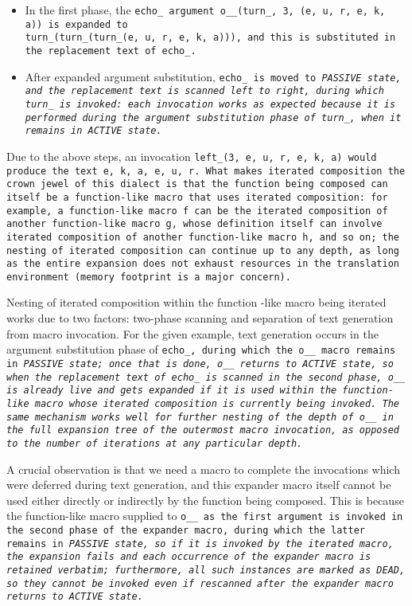 \begin{itemize}[nosep]

\item In the first phase, the \tt{echo_} argument
\tt{o__(turn_, 3, (e, u, r, e, k, a))} is expanded to\\
\tt{turn_(turn_(turn_(e, u, r, e, k, a)))}, and this
is substituted in the replacement text of \tt{echo_}.

\item After expanded argument substitution,
\tt{echo_} is moved to \it{\tt{PASSIVE}} state, and the replacement
text is scanned left to right, during which \tt{turn_} is invoked:
each invocation works as expected because it is performed during the argument
substitution phase of \tt{turn_}, when it remains in \it{\tt{ACTIVE}} state.

\end{itemize}

Due to the above steps, an invocation \tt{left_(3, e, u, r, e, k, a)}
would produce the text \tt{e, k, a, e, u, r}.
What makes iterated composition the crown jewel of this dialect is that the
function being composed can itself be a function-like macro that uses iterated
composition: for example, a function-like macro \tt{f} can be the iterated
composition of another function-like macro \tt{g}, whose definition itself can
involve iterated composition of another function-like macro \tt{h}, and so on;
the nesting of iterated composition can continue up to any depth, as long as
the entire expansion does not exhaust resources in the translation environment
(memory footprint is a major concern).

Nesting of iterated composition within the function%
-like macro being iterated works due to two factors:
two-phase scanning and separation of text generation from macro invocation.
For the given example, text generation occurs in the argument substitution phase
of \tt{echo_}, during which the \tt{o__} macro remains in \it{\tt{PASSIVE}}
state; once that is done, \tt{o__} returns to \it{\tt{ACTIVE}} state,
so when the replacement text of \tt{echo_} is scanned in the second phase,
\tt{o__} is already live and gets expanded if it is used within the
function-like macro whose iterated composition is currently being invoked.
The same mechanism works well for further nesting of the depth of
\tt{o__} in the full expansion tree of the outermost macro invocation,
as opposed to the number of iterations at any particular depth.

A crucial observation is that we need a macro to complete the invocations
which were deferred during text generation, and this expander macro itself
cannot be used either directly or indirectly by the function being composed.
This is because the function-like macro supplied to \tt{o__} as the
first argument is invoked in the second phase of the expander macro,
during which the latter remains in \it{\tt{PASSIVE}} state, so if
it is invoked by the iterated macro, the expansion fails and each
occurrence of the expander macro is retained verbatim; furthermore,
all such instances are marked as \it{\tt{DEAD}}, so they cannot be invoked
even if rescanned after the expander macro returns to \it{\tt{ACTIVE}} state.


